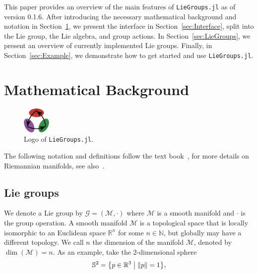 \documentclass{juliacon}
\newcommand{\LieGroupsVersion}{0.1.6}
\begin{document}
This paper provides an overview of the main features of \verb|LieGroups.jl| as of version \LieGroupsVersion{}.
After introducing the necessary mathematical background and notation in Section~\ref{sec:Notation},
we present the interface in Section~\ref{sec:Interface}, split into the Lie group, the Lie algebra, and group actions.
In Section~\ref{sec:LieGroups}, we present an overview of currently implemented Lie groups.
Finally, in Section~\ref{sec:Example}, we demonstrate how to get started and use \verb|LieGroups.jl|.

\section{Mathematical Background}%
\label{sec:Notation}

\begin{figure}
    \centering
    \includegraphics[width=0.12\textwidth]{logo.png}
    \vspace{.5\baselineskip}
    \caption*{Logo of \texttt{LieGroups.jl}.}%
    \label{fig:liegroups_logo}
\end{figure}

The following notation and definitions follow the text book~\cite{HilgertNeeb:2012},
for more details on Riemannian manifolds, see also~\cite{DoCarmo:1992}.

\subsection{Lie groups}
We denote a Lie group by \(\mathcal{G} = (\mathcal{M}, \cdot)\) where \(\mathcal{M}\) is a smooth manifold and \(\cdot\) is the group operation.
A smooth manifold \(\mathcal{M}\) is a topological space that is locally isomorphic to an Euclidean space \(\mathbb{R}^n\) for some \(n \in \mathbb{N}\), but globally may have a different topology.
We call \(n\) the dimension of the manifold \(\mathcal{M}\), denoted by \(\dim(\mathcal{M}) = n\).
As an example, take the \(2\)-dimensional sphere
\begin{equation*}
\mathbb{S}^2 = \bigl\{ p \in \mathbb{R}^3 \bigm| \lVert p\rVert = 1\bigr\},
\end{equation*}
\end{document}
